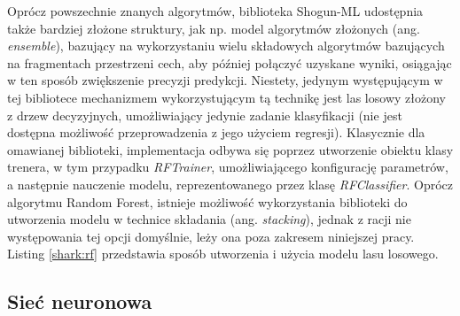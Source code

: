 Oprócz powszechnie znanych algorytmów, biblioteka Shogun-ML udostępnia także bardziej złożone struktury, jak np. model algorytmów złożonych (ang. \textit{ensemble}), bazujący na wykorzystaniu wielu składowych algorytmów bazujących na fragmentach przestrzeni cech, aby później połączyć uzyskane wyniki, osiągając w ten sposób zwiększenie precyzji predykcji. Niestety, jedynym występującym w tej bibliotece mechanizmem wykorzystującym tą technikę jest las losowy złożony z drzew decyzyjnych, umożliwiający jedynie zadanie klasyfikacji (nie jest dostępna możliwość przeprowadzenia z jego użyciem regresji). Klasycznie dla omawianej biblioteki, implementacja odbywa się poprzez utworzenie obiektu klasy trenera, w tym przypadku \textit{RFTrainer}, umożliwiającego konfigurację parametrów, a następnie nauczenie modelu, reprezentowanego przez klasę \textit{RFClassifier}. Oprócz algorytmu Random Forest, istnieje możliwość wykorzystania biblioteki do utworzenia modelu w technice składania (ang. \textit{stacking}), jednak z racji nie występowania tej opcji domyślnie, leży ona poza zakresem niniejszej pracy. Listing \ref{shark:rf} przedstawia sposób utworzenia i użycia modelu lasu losowego.


\subsection{Sieć neuronowa}

